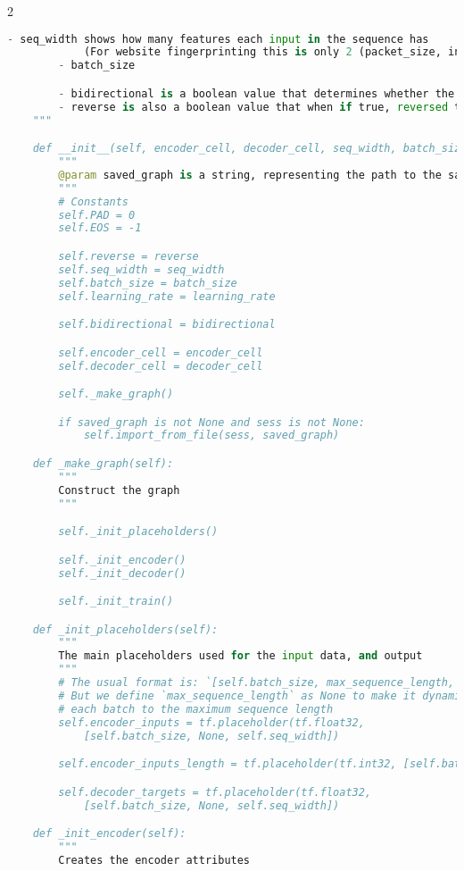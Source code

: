 \begin{landscape}
\begin{multicols}{2}
\begin{lstlisting}[language=Python]
        - seq_width shows how many features each input in the sequence has
            (For website fingerprinting this is only 2 (packet_size, incoming))
        - batch_size

        - bidirectional is a boolean value that determines whether the encoder is bidirectional or not
        - reverse is also a boolean value that when if true, reversed the traces for training
    """

    def __init__(self, encoder_cell, decoder_cell, seq_width, batch_size=100, bidirectional=False, reverse=False, saved_graph=None, sess=None, learning_rate=0.0006):
        """
        @param saved_graph is a string, representing the path to the saved graph
        """
        # Constants
        self.PAD = 0
        self.EOS = -1

        self.reverse = reverse
        self.seq_width = seq_width
        self.batch_size = batch_size
        self.learning_rate = learning_rate

        self.bidirectional = bidirectional

        self.encoder_cell = encoder_cell
        self.decoder_cell = decoder_cell

        self._make_graph()

        if saved_graph is not None and sess is not None:
            self.import_from_file(sess, saved_graph)

    def _make_graph(self):
        """
        Construct the graph
        """

        self._init_placeholders()

        self._init_encoder()
        self._init_decoder()

        self._init_train()

    def _init_placeholders(self):
        """
        The main placeholders used for the input data, and output
        """
        # The usual format is: `[self.batch_size, max_sequence_length, self.seq_width]`
        # But we define `max_sequence_length` as None to make it dynamic so we only need to pad
        # each batch to the maximum sequence length
        self.encoder_inputs = tf.placeholder(tf.float32,
            [self.batch_size, None, self.seq_width])

        self.encoder_inputs_length = tf.placeholder(tf.int32, [self.batch_size])

        self.decoder_targets = tf.placeholder(tf.float32,
            [self.batch_size, None, self.seq_width])

    def _init_encoder(self):
        """
        Creates the encoder attributes


\end{lstlisting}
\end{multicols}
\end{landscape}
